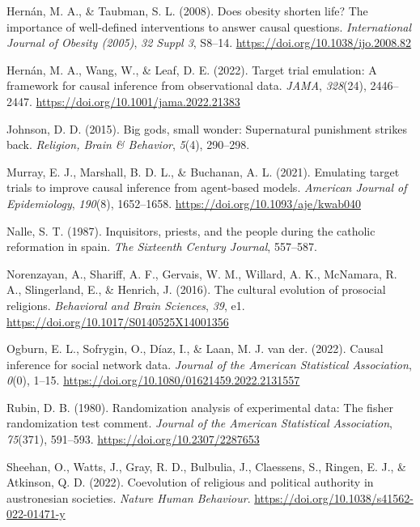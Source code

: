 \documentclass[
  single column]{article}
\newlength{\cslhangindent}
\newenvironment{CSLReferences}[2] %
 {\begin{list}{}{%
  \setlength{\itemindent}{0pt}
  \setlength{\leftmargin}{0pt}
  \setlength{\parsep}{0pt}
  \ifodd #1
   \setlength{\leftmargin}{\cslhangindent}
   \setlength{\itemindent}{-1\cslhangindent}
  \fi
  \setlength{\itemsep}{#2\baselineskip}}}
 {\end{list}}
\begin{document}
\begin{CSLReferences}{1}{0}
Hernán, M. A., \& Taubman, S. L. (2008). Does obesity shorten life? The
importance of well-defined interventions to answer causal questions.
\emph{International Journal of Obesity (2005)}, \emph{32 Suppl 3},
S8--14. \url{https://doi.org/10.1038/ijo.2008.82}

Hernán, M. A., Wang, W., \& Leaf, D. E. (2022). Target trial emulation:
A framework for causal inference from observational data. \emph{JAMA},
\emph{328}(24), 2446--2447.
\url{https://doi.org/10.1001/jama.2022.21383}

Johnson, D. D. (2015). Big gods, small wonder: Supernatural punishment
strikes back. \emph{Religion, Brain \& Behavior}, \emph{5}(4), 290--298.

Murray, E. J., Marshall, B. D. L., \& Buchanan, A. L. (2021). Emulating
target trials to improve causal inference from agent-based models.
\emph{American Journal of Epidemiology}, \emph{190}(8), 1652--1658.
\url{https://doi.org/10.1093/aje/kwab040}

Nalle, S. T. (1987). Inquisitors, priests, and the people during the
catholic reformation in spain. \emph{The Sixteenth Century Journal},
557--587.

Norenzayan, A., Shariff, A. F., Gervais, W. M., Willard, A. K.,
McNamara, R. A., Slingerland, E., \& Henrich, J. (2016). The cultural
evolution of prosocial religions. \emph{Behavioral and Brain Sciences},
\emph{39}, e1. \url{https://doi.org/10.1017/S0140525X14001356}

Ogburn, E. L., Sofrygin, O., Díaz, I., \& Laan, M. J. van der. (2022).
Causal inference for social network data. \emph{Journal of the American
Statistical Association}, \emph{0}(0), 1--15.
\url{https://doi.org/10.1080/01621459.2022.2131557}

Rubin, D. B. (1980). Randomization analysis of experimental data: The
fisher randomization test comment. \emph{Journal of the American
Statistical Association}, \emph{75}(371), 591--593.
\url{https://doi.org/10.2307/2287653}

Sheehan, O., Watts, J., Gray, R. D., Bulbulia, J., Claessens, S.,
Ringen, E. J., \& Atkinson, Q. D. (2022). Coevolution of religious and
political authority in austronesian societies. \emph{Nature Human
Behaviour}. \url{https://doi.org/10.1038/s41562-022-01471-y}


\end{CSLReferences}
\end{document}
